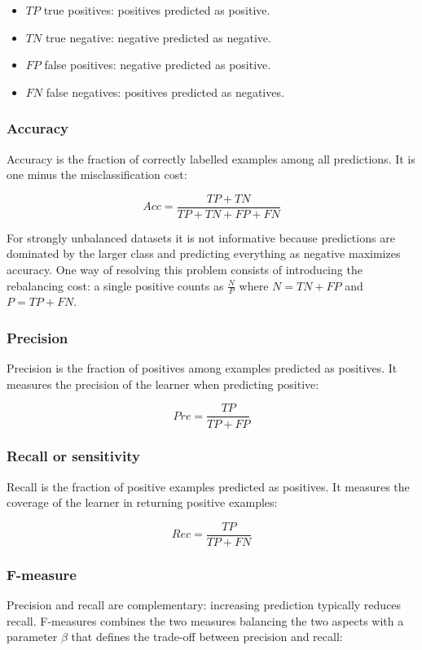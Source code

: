 	\begin{multicols}{2}
		\begin{itemize}
			\item $TP$ true positives: positives predicted as positive.
			\item $TN$ true negative: negative predicted as negative.
			\item $FP$ false positives: negative predicted as positive.
			\item $FN$ false negatives: positives predicted as negatives.
		\end{itemize}
	\end{multicols}

		\subsubsection{Accuracy}
		Accuracy is the fraction of correctly labelled examples among all predictions.
		It is one minus the misclassification cost:

		$$Acc = \frac{TP+TN}{TP+TN+FP+FN}$$

		For strongly unbalanced datasets it is not informative because predictions are dominated by the larger class and predicting everything as negative maximizes accuracy.
		One way of resolving this problem consists of introducing the rebalancing cost: a single positive counts as $\frac{N}{P}$ where $N = TN+FP$ and $P=TP+FN$.

		\subsubsection{Precision}
		Precision is the fraction of positives among examples predicted as positives.
		It measures the precision of the learner when predicting positive:

		$$Pre = \frac{TP}{TP+FP}$$

		\subsubsection{Recall or sensitivity}
		Recall is the fraction of positive examples predicted as positives.
		It measures the coverage of the learner in returning positive examples:

		$$Rec = \frac{TP}{TP+FN}$$

		\subsubsection{F-measure}
		Precision and recall are complementary: increasing prediction typically reduces recall.
		F-measures combines the two measures balancing the two aspects with a parameter $\beta$ that defines the trade-off between precision and recall:

